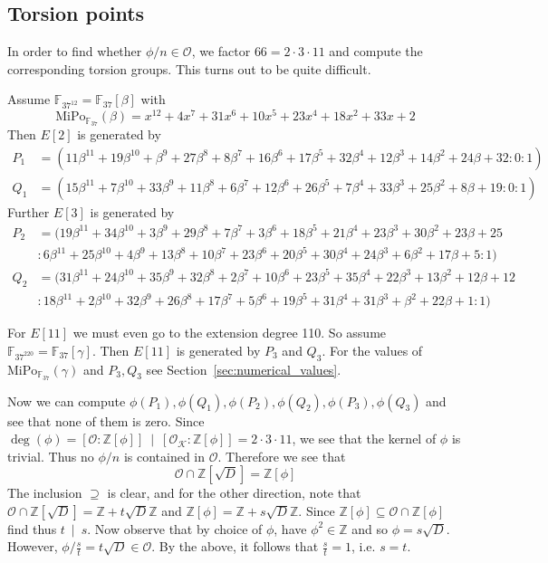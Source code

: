 \documentclass{scrartcl}
\newcommand{\Z}{\mathbb{Z}}
\newcommand{\F}{\mathbb{F}}
\newcommand{\divides}{\ \mid \ }
\newcommand{\K}{\mathcal{K}}
\renewcommand{\O}{\mathcal{O}}
\theoremstyle{definition}
\begin{document}
\subsection*{Torsion points}
In order to find whether $\phi/n \in \O$, we factor $66 = 2 \cdot 3 \cdot 11$ and compute the corresponding torsion groups.
This turns out to be quite difficult.

Assume $\F_{37^{12}} = \F_{37}[\beta]$ with
\begin{equation*}
    \mathrm{MiPo}_{\F_{37}}(\beta) = x^{12} + 4x^7 + 31x^6 + 10x^5 + 23x^4 + 18x^2 + 33x + 2
\end{equation*}
Then $E[2]$ is generated by
\begin{align*}
    P_1 &= (11\beta^{11} + 19\beta^{10} + \beta^9 + 27\beta^8 + 8\beta^7 + 16\beta^6 + 17\beta^5 + 32\beta^4 + 12\beta^3 + 14\beta^2 + 24\beta + 32 : 0 : 1) \\
    Q_1 &= (15\beta^{11} + 7\beta^{10} + 33\beta^9 + 11\beta^8 + 6\beta^7 + 12\beta^6 + 26\beta^5 + 7\beta^4 + 33\beta^3 + 25\beta^2 + 8\beta + 19 : 0 : 1)
\end{align*}
Further $E[3]$ is generated by
\begin{align*}
    P_2 &= (19\beta^{11} + 34\beta^{10} + 3\beta^9 + 29\beta^8 + 7\beta^7 + 3\beta^6 + 18\beta^5 + 21\beta^4 + 23\beta^3 + 30\beta^2 + 23\beta + 25 \\
    &: 6\beta^{11} + 25\beta^{10} + 4\beta^9 + 13\beta^8 + 10\beta^7 + 23\beta^6 + 20\beta^5 + 30\beta^4 + 24\beta^3 + 6\beta^2 + 17\beta + 5 : 1) \\
    Q_2 &= (31\beta^{11} + 24\beta^{10} + 35\beta^9 + 32\beta^8 + 2\beta^7 + 10\beta^6 + 23\beta^5 + 35\beta^4 + 22\beta^3 + 13\beta^2 + 12\beta + 12 \\
    &: 18\beta^{11} + 2\beta^{10} + 32\beta^9 + 26\beta^8 + 17\beta^7 + 5\beta^6 + 19\beta^5 + 31\beta^4 + 31\beta^3 + \beta^2 + 22\beta + 1 : 1)
\end{align*}

For $E[11]$ we must even go to the extension degree 110.
So assume $\F_{37^{220}} = \F_{37}[\gamma]$.
Then $E[11]$ is generated by $P_3$ and $Q_3$.
For the values of $\mathrm{MiPo}_{\F_{37}}(\gamma)$ and $P_3, Q_3$ see Section~\ref{sec:numerical_values}.

Now we can compute $\phi(P_1), \phi(Q_1), \phi(P_2), \phi(Q_2), \phi(P_3), \phi(Q_3)$ and see that none of them is zero.
Since $\deg(\phi) = [\O : \Z[\phi]] \divides [\O_\K : \Z[\phi]] = 2 \cdot 3 \cdot 11$, we see that the kernel of $\phi$ is trivial.
Thus no $\phi/n$ is contained in $\O$.
Therefore we see that
\begin{equation*}
    \O \cap \Z[\sqrt{D}] = \Z[\phi]
\end{equation*}
The inclusion $\supseteq$ is clear, and for the other direction, note that $\O \cap \Z[\sqrt{D}] = \Z + t\sqrt{D}\Z$ and $\Z[\phi] = \Z + s\sqrt{D}\Z$.
Since $\Z[\phi] \subseteq \O \cap \Z[\phi]$ find thus $t \divides s$.
Now observe that by choice of $\phi$, have $\phi^2 \in \Z$ and so $\phi = s\sqrt{D}$.
However, $\phi/\frac s t = t \sqrt{D} \in \O$.
By the above, it follows that $\frac s t = 1$, i.e. $s = t$.
\end{document}
